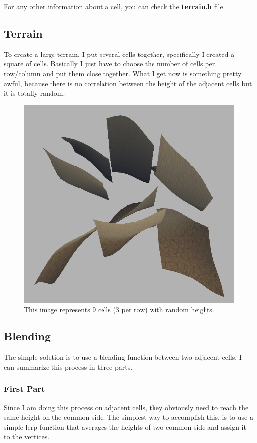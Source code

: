 \noindent
For any other information about a cell, you can check the \textbf{terrain.h} file.

\subsection{Terrain}

To create a large terrain, I put several cells together, specifically I created a square of cells. Basically I just have to choose the number of cells per row/column and put them close together. What I get now is something pretty awful, because there is no correlation between the height of the adjacent cells but it is totally random.

\smallbreak

\begin{figure}[hbt!]
	\centering
	\includegraphics[width= 0.55
	\textwidth]{images/terrain3.png}
	\caption{This image represents 9 cells (3 per row) with random heights.}
\end{figure} 

\newpage

\subsection{Blending}
The simple solution is to use a blending function between two adjacent cells.
I can summarize this process in three parts.

\subsubsection{First Part}

Since I am doing this process on adjacent cells, they obviously need to reach the same height on the common side. The simplest way to accomplish this, is to use a simple lerp function that averages the heights of two common side and assign it to the vertices.

